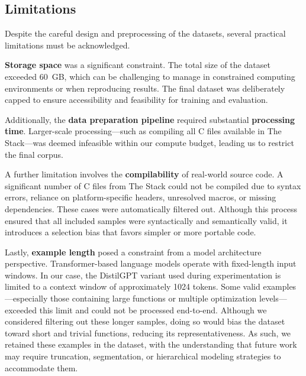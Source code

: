 \documentclass[../main.tex]{subfiles}
\begin{document}
\subsection{Limitations}

Despite the careful design and preprocessing of the datasets, several practical limitations must be acknowledged.

\textbf{Storage space} was a significant constraint. The total size of the dataset exceeded 60~GB, which can be challenging to manage in constrained computing environments or when reproducing results. The final dataset was deliberately capped to ensure accessibility and feasibility for training and evaluation.

Additionally, the \textbf{data preparation pipeline} required substantial \textbf{processing time}. Larger-scale processing---such as compiling all C files available in The Stack---was deemed infeasible within our compute budget, leading us to restrict the final corpus.

A further limitation involves the \textbf{compilability} of real-world source code. A significant number of C files from The Stack could not be compiled due to syntax errors, reliance on platform-specific headers, unresolved macros, or missing dependencies. These cases were automatically filtered out. Although this process ensured that all included samples were syntactically and semantically valid, it introduces a selection bias that favors simpler or more portable code.

Lastly, \textbf{example length} posed a constraint from a model architecture perspective. Transformer-based language models operate with fixed-length input windows. In our case, the DistilGPT variant used during experimentation is limited to a context window of approximately 1024 tokens. Some valid examples---especially those containing large functions or multiple optimization levels---exceeded this limit and could not be processed end-to-end. Although we considered filtering out these longer samples, doing so would bias the dataset toward short and trivial functions, reducing its representativeness. As such, we retained these examples in the dataset, with the understanding that future work may require truncation, segmentation, or hierarchical modeling strategies to accommodate them.
\end{document}

